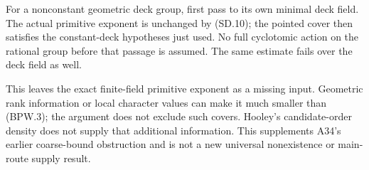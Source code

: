 For a nonconstant geometric deck group, first pass to its own
minimal deck field. The actual primitive exponent is unchanged
by (SD.10); the pointed cover then satisfies the constant-deck
hypotheses just used. No full cyclotomic action on the rational
group before that passage is assumed. The same estimate fails
over the deck field as well.

This leaves the exact finite-field primitive exponent as a
missing input. Geometric rank information or local character
values can make it much smaller than (BPW.3); the argument
does not exclude such covers. Hooley's candidate-order density
does not supply that additional information. This supplements
A34's earlier coarse-bound obstruction and is not a new
universal nonexistence or main-route supply result.
